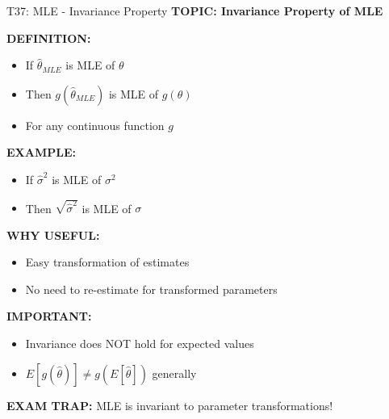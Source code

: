 \documentclass[8pt]{beamer}
\begin{document}
	\begin{frame}{T37: MLE - Invariance Property}
		\fontsize{6.5}{7.5}\selectfont
		\textbf{TOPIC: Invariance Property of MLE}
		
		\vspace{0.1cm}
		\textbf{DEFINITION:}
		\begin{itemize}
			\item If $\hat{\theta}_{MLE}$ is MLE of $\theta$
			\item Then $g(\hat{\theta}_{MLE})$ is MLE of $g(\theta)$
			\item For any continuous function $g$
		\end{itemize}
		
		\vspace{0.1cm}
		\textbf{EXAMPLE:}
		\begin{itemize}
			\item If $\hat{\sigma}^2$ is MLE of $\sigma^2$
			\item Then $\sqrt{\hat{\sigma}^2}$ is MLE of $\sigma$
		\end{itemize}
		
		\vspace{0.1cm}
		\textbf{WHY USEFUL:}
		\begin{itemize}
			\item Easy transformation of estimates
			\item No need to re-estimate for transformed parameters
		\end{itemize}
		
		\vspace{0.1cm}
		\textbf{IMPORTANT:}
		\begin{itemize}
			\item Invariance does NOT hold for expected values
			\item $E[g(\hat{\theta})] \neq g(E[\hat{\theta}])$ generally
		\end{itemize}
		
		\textcolor{myred}{\textbf{EXAM TRAP:}} MLE is \textcolor{myblue}{invariant} to parameter transformations!
	\end{frame}
	
\end{document}
